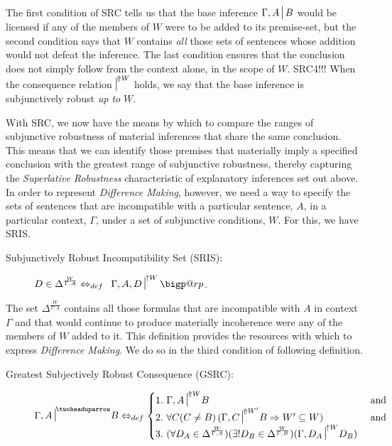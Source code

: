 \documentclass{article}
\makeatletter
\newcommand{\nc}{\turnstile{s}{w}{}{}{n}}
\newcommand{\bigperp}{%
  \mathop{\mathpalette\bigp@rp\relax}%
  \displaylimits
}
\newcommand{\bigp@rp}[2]{%
  \vcenter{
    \m@th\hbox{\scalebox{\ifx#1\displaystyle2.1\else1.5\fi}{$#1\perp$}}
  }%
}
\makeatother
\begin{document}
The first condition of SRC tells us that the base inference $ \Gamma, A \nc B $ would be licensed if any of the members of  $W$ were to be added to its premise-set, but the second condition says that $W$ contains \textit{all} those sets of sentences whose addition would not defeat the inference. The last condition  ensures that the conclusion does not simply follow from the context alone, in the scope of $W$. \color{red} SRC4!!!   \color{black}      When the consequence relation $ {\nc}^{\Uparrow W} $ holds, we say that the base inference is subjunctively robust \textit{up to} $ W $. 

With SRC, we now have the means by which to compare the ranges of subjunctive robustness of material inferences that share the same conclusion. This means that we can identify those premises that materially imply a specified conclusion with the greatest range of subjunctive robustness, thereby capturing the \textit{Superlative Robustness} characteristic of explanatory inferences set out above. In order to represent \textit{Difference Making}, however, we need a way to specify the sets of sentences that are incompatible with a particular sentence, $A$, in a particular context, $\Gamma$,  under a set of subjunctive conditions, $W$. For this, we have SRIS.

\begin{description}
	\item[Subjunctively Robust Incompatibility Set (SRIS):]
	
	 $ D \in \Delta^\frac{W}{\Gamma, A}   \Leftrightarrow_{def} \,\,\,{\Gamma, A, D \nc}^{\uparrow W}\bigperp $.

\end{description}

The set $ \Delta^\frac{W}{\Gamma, A}  $ contains all those formulas that are incompatible with $A$ in context $ \Gamma $ and that would continue to produce materially incoherence were any of the members of $W$ added to it. This definition provides the resources with which to express \textit{Difference Making}. We do so in the third condition of following definition.

\begin{description}
	\item[Greatest Subjectively Robust Consequence (GSRC):]
		\begin{equation}
		     {\Gamma, A \nc}^{\twoheaduparrow} B  \Leftrightarrow_{def}  
			    \begin{cases}\nonumber
			    	1.\,\, {\Gamma, A\nc}^{\Uparrow W} B & $ and $ \\
		    		2.\,\, \forall C(C \neq B)\,({\Gamma, C\nc}^{\Uparrow W'} B \Rightarrow W'\subseteq W ) & $ and $ \\
		    		3.\,\, (\forall D_{A} \in \Delta^\frac{W}{\Gamma, A}) (\exists!D_{B} \in \Delta^\frac{W}{\Gamma, B})({\Gamma, D_{A} \nc}^{\uparrow W} D_{B})
		    	\end{cases}
		\end{equation}

\end{description}
\end{document}
